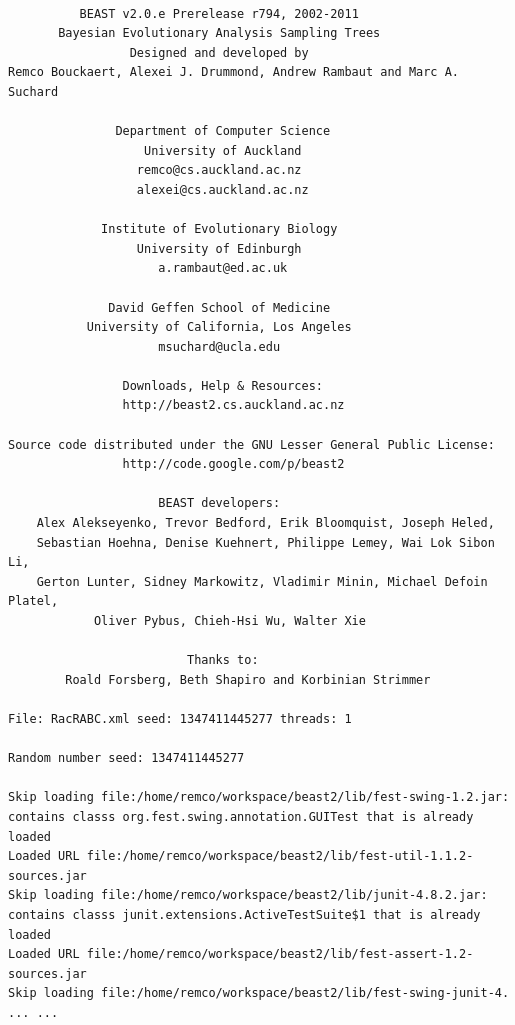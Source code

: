 \documentclass{article}
\begin{document}
{\scriptsize   
\begin{verbatim}

          BEAST v2.0.e Prerelease r794, 2002-2011
       Bayesian Evolutionary Analysis Sampling Trees
                 Designed and developed by
Remco Bouckaert, Alexei J. Drummond, Andrew Rambaut and Marc A. Suchard
                              
               Department of Computer Science
                   University of Auckland
                  remco@cs.auckland.ac.nz
                  alexei@cs.auckland.ac.nz
                              
             Institute of Evolutionary Biology
                  University of Edinburgh
                     a.rambaut@ed.ac.uk
                              
              David Geffen School of Medicine
           University of California, Los Angeles
                     msuchard@ucla.edu
                              
                Downloads, Help & Resources:
              	http://beast2.cs.auckland.ac.nz
                              
Source code distributed under the GNU Lesser General Public License:
              	http://code.google.com/p/beast2
                              
                     BEAST developers:
	Alex Alekseyenko, Trevor Bedford, Erik Bloomquist, Joseph Heled, 
	Sebastian Hoehna, Denise Kuehnert, Philippe Lemey, Wai Lok Sibon Li, 
	Gerton Lunter, Sidney Markowitz, Vladimir Minin, Michael Defoin Platel, 
          	Oliver Pybus, Chieh-Hsi Wu, Walter Xie
                              
                         Thanks to:
    	Roald Forsberg, Beth Shapiro and Korbinian Strimmer

File: RacRABC.xml seed: 1347411445277 threads: 1

Random number seed: 1347411445277

Skip loading file:/home/remco/workspace/beast2/lib/fest-swing-1.2.jar: contains classs org.fest.swing.annotation.GUITest that is already loaded
Loaded URL file:/home/remco/workspace/beast2/lib/fest-util-1.1.2-sources.jar
Skip loading file:/home/remco/workspace/beast2/lib/junit-4.8.2.jar: contains classs junit.extensions.ActiveTestSuite$1 that is already loaded
Loaded URL file:/home/remco/workspace/beast2/lib/fest-assert-1.2-sources.jar
Skip loading file:/home/remco/workspace/beast2/lib/fest-swing-junit-4.
... ...

\end{verbatim}}
\end{document}
